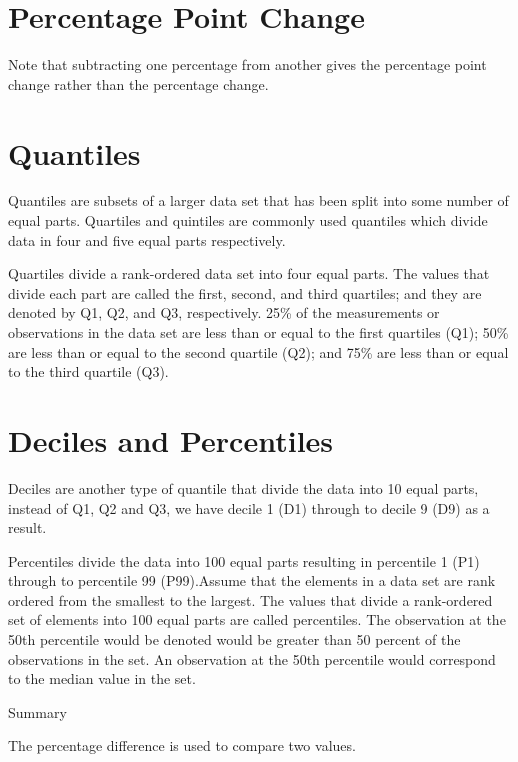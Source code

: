 \documentclass[
]{book}
\begin{document}
\hypertarget{percentage-point-change}{%
\section{Percentage Point Change}\label{percentage-point-change}}

Note that subtracting one percentage from another gives the percentage point change rather than the percentage change.

\hypertarget{quantiles}{%
\section{Quantiles}\label{quantiles}}

Quantiles are subsets of a larger data set that has been split into some number of equal parts. Quartiles and quintiles are commonly used quantiles which divide data in four and five equal parts respectively.

Quartiles divide a rank-ordered data set into four equal parts. The values that divide each part are called the first, second, and third quartiles; and they are denoted by Q1, Q2, and Q3, respectively. 25\% of the measurements or observations in the data set are less than or equal to the first quartiles (Q1); 50\% are less than or equal to the second quartile (Q2); and 75\% are less than or equal to the third quartile (Q3).

\hypertarget{deciles-and-percentiles}{%
\section{Deciles and Percentiles}\label{deciles-and-percentiles}}

Deciles are another type of quantile that divide the data into 10 equal parts, instead of Q1, Q2 and Q3, we have decile 1 (D1) through to decile 9 (D9) as a result.

Percentiles divide the data into 100 equal parts resulting in percentile 1 (P1) through to percentile 99 (P99).Assume that the elements in a data set are rank ordered from the smallest to the largest. The values that divide a rank-ordered set of elements into 100 equal parts are called percentiles. The observation at the 50th percentile would be denoted would be greater than 50 percent of the observations in the set. An observation at the 50th percentile would correspond to the median value in the set.

Summary

The percentage difference is used to compare two values.
\end{document}
